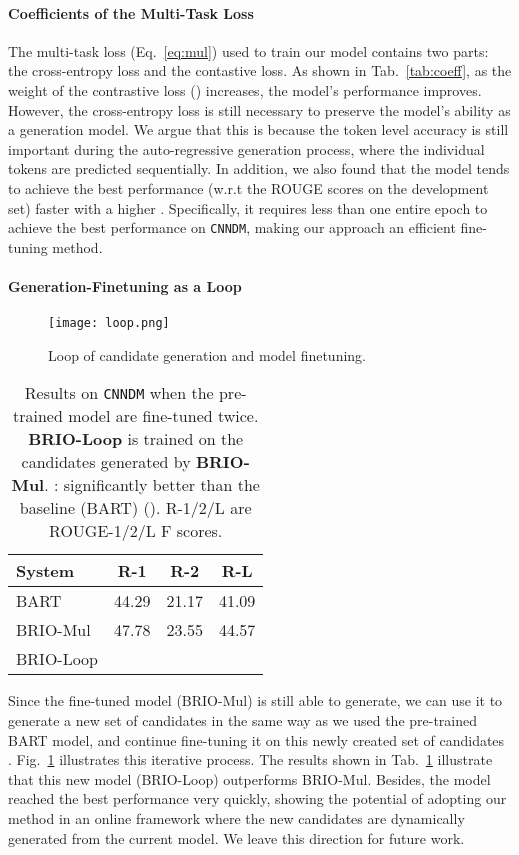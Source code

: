 \documentclass[11pt]{article}
\newcommand{\model}{BRIO\xspace}
\begin{document}
\paragraph{Coefficients of the Multi-Task Loss} The multi-task loss (Eq.~\ref{eq:mul}) used to train our model contains two parts: the cross-entropy loss and the contastive loss. 
As shown in Tab.~\ref{tab:coeff}, as the weight of the contrastive loss () increases, the model's performance improves. 
However, the cross-entropy loss is still necessary to preserve the model's ability as a generation model.
We argue that this is because the token level accuracy is still important during the auto-regressive generation process, where the individual tokens are predicted sequentially. 
In addition, we also found that the model tends to achieve the best performance (w.r.t the ROUGE scores on the development set) faster with a higher .
Specifically, it requires less than one entire epoch to achieve the best performance on \texttt{CNNDM}, making our approach an efficient fine-tuning method.

\paragraph{Generation-Finetuning as a Loop}

\begin{figure}[t!]
    \centering
    \texttt{[image: loop.png]}
    \caption{Loop of candidate generation and model finetuning. }
    \label{fig:loop}
\end{figure}

\begin{table}[t!]
\centering
\small
\begin{tabular}{lccc}
\toprule
\textbf{System} & \textbf{R-1} & \textbf{R-2} & \textbf{R-L}  \\
\midrule
 BART & 44.29 & 21.17 & 41.09 \\
 \model-Mul & 47.78 & 23.55 & 44.57 \\
 \midrule
 \model-Loop &  &  &  \\
\bottomrule
\end{tabular}
\caption{\label{tab:loop} Results on \texttt{CNNDM} when the pre-trained model are fine-tuned twice.
\textbf{\model-Loop} is trained on the candidates generated by \textbf{\model-Mul}.
\dag: significantly better than the baseline (BART) ().
R-1/2/L are ROUGE-1/2/L F scores.}
\end{table}

Since the fine-tuned model (\model-Mul) is still able to generate, we can use it to generate a new set of candidates in the same way as we used the pre-trained BART model, and continue fine-tuning it on this newly created set of candidates \citep{och-2003-minimum}. 
Fig.~\ref{fig:loop} illustrates this iterative process.
The results shown in Tab.~\ref{tab:loop} illustrate that this new model (\model-Loop) outperforms \model-Mul.
Besides, the model reached the best performance very quickly, showing the potential of adopting our method in an online framework where the new candidates are dynamically generated from the current model.
We leave this direction for future work.
\end{document}
